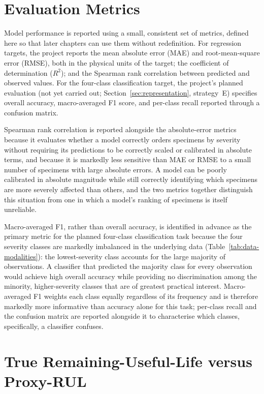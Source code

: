 \section{Evaluation Metrics}
\label{sec:metrics}

Model performance is reported using a small, consistent set of metrics,
defined here so that later chapters can use them without redefinition.
For regression targets, the project reports the mean absolute error (MAE)
and root-mean-square error (RMSE), both in the physical units of the
target; the coefficient of determination ($R^2$); and the Spearman rank
correlation between predicted and observed values. For the four-class
classification target, the project's planned evaluation (not yet carried
out; Section~\ref{sec:representation}, strategy~E) specifies overall
accuracy, macro-averaged F1 score, and per-class recall reported through a
confusion matrix.

Spearman rank correlation is reported alongside the absolute-error metrics
because it evaluates whether a model correctly orders specimens by
severity without requiring its predictions to be correctly scaled or
calibrated in absolute terms, and because it is markedly less sensitive
than MAE or RMSE to a small number of specimens with large absolute
errors. A model can be poorly calibrated in absolute magnitude while still
correctly identifying which specimens are more severely affected than
others, and the two metrics together distinguish this situation from one
in which a model's ranking of specimens is itself unreliable.

Macro-averaged F1, rather than overall accuracy, is identified in advance
as the primary metric for the planned four-class classification task
because the four severity classes are markedly imbalanced in the
underlying data (Table~\ref{tab:data-modalities}): the lowest-severity
class accounts for the large majority of observations. A classifier that
predicted the majority class for every observation would achieve high
overall accuracy while providing no discrimination among the
minority, higher-severity classes that are of greatest practical
interest. Macro-averaged F1 weights each class equally regardless of its
frequency and is therefore markedly more informative than accuracy alone
for this task; per-class recall and the confusion matrix are reported
alongside it to characterise which classes, specifically, a classifier
confuses.

\section{True Remaining-Useful-Life versus Proxy-RUL}
\label{sec:proxy-rul}

